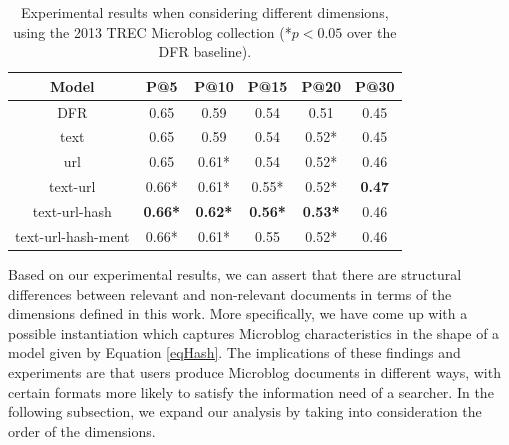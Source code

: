 \begin{table}[]

\caption{Experimental results when considering different dimensions, using the 2013 TREC Microblog collection (*\(p <0.05 \) over the DFR baseline).}

\centering

\begin{tabular}{|c|c|c|c|c|c|}

\hline Model & P@5 & P@10  & P@15  & P@20  & P@30  \\

\hline

DFR & 0.65 & 0.59 & 0.54 & 0.51 & 0.45 \\

\hline

text & 0.65 & 0.59 & 0.54 & 0.52* & 0.45 \\

url & 0.65 & 0.61* & 0.54 & 0.52* & 0.46 \\

text-url & 0.66* & 0.61* & 0.55* & 0.52* & \textbf{0.47} \\

text-url-hash & \textbf{0.66*} & \textbf{0.62*} & \textbf{0.56*} & \textbf{0.53*} & 0.46 \\

text-url-hash-ment & 0.66* & 0.61* & 0.55 & 0.52* & 0.46 \\

\hline 



\end{tabular} 

\label{dimResults}

\vspace{0.30cm}

\end{table}



Based on our experimental results, we can assert that there are structural differences between relevant and non-relevant documents in terms of the dimensions defined in this work. More specifically, we have come up with a possible instantiation which captures Microblog characteristics in the shape of a model given by Equation \ref{eqHash}. The implications of these findings and experiments are that users produce Microblog documents in different ways, with certain formats more likely to satisfy the information need of a searcher. In the following subsection, we expand our analysis by taking into consideration the order of the dimensions.

